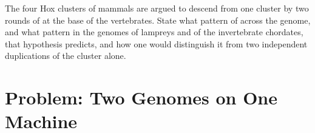 \begin{exercise}[$\star\star\star$]\label{exo:b3:genomics:12}
The four Hox clusters of mammals are argued to descend from one
cluster by two rounds of  at the base of the
vertebrates. State what pattern of  across the genome, and
what pattern in the genomes of lampreys and of the invertebrate
chordates, that hypothesis predicts, and how one would distinguish it
from two independent duplications of the cluster alone.
\end{exercise}

\section{Problem: Two Genomes on One Machine}

